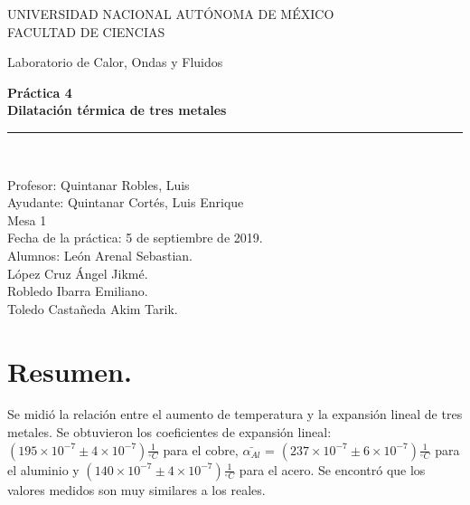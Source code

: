 \documentclass[a4paper]{article}
\begin{document}
\begin{titlepage}
\begin{center}
\begin{figure}
\end{figure}
\vspace*{0.5in}
UNIVERSIDAD NACIONAL AUTÓNOMA DE MÉXICO\\
\vspace*{0.2in}
FACULTAD DE CIENCIAS \\
\vspace*{0.5in}
\begin{large}
Laboratorio de Calor, Ondas y Fluidos\\
\end{large}
\vspace*{0.2in}
\begin{Large}
\textbf{Práctica 4} \\
\textbf{Dilatación térmica de tres metales} \\
\end{Large}
\vspace*{0.3in}
\vspace*{0.3in}
\rule{80mm}{0.1mm}\\
\vspace*{0.1in}
\begin{large}
Profesor:  Quintanar Robles, Luis  \\
Ayudante: Quintanar Cortés, Luis Enrique \\
Mesa 1\\
Fecha de la práctica: 5 de septiembre de 2019.\\
Alumnos: León Arenal Sebastian.\\
López Cruz Ángel Jikmé. \\
Robledo Ibarra Emiliano. \\
Toledo Castañeda Akim Tarik.\\

\end{large}
\end{center}
\end{titlepage}



\section*{Resumen.}
Se midió la relación entre el aumento de temperatura y la expansión lineal de tres metales. Se obtuvieron los coeficientes de expansión lineal: $(195\times 10^{-7}\pm 4\times10^{-7}) \frac{1}{^{\circ}C}$  para el cobre,  $\bar{\alpha_{Al}}$ = $(237\times 10^{-7} \pm 6\times10^{-7}) \frac{1}{^{\circ}C}$ para el aluminio y  $(140\times 10^{-7}\pm 4\times10^{-7}) \frac{1}{^{\circ}C}$ para el acero. Se encontró que los valores medidos son muy similares a los reales.
\end{document}
